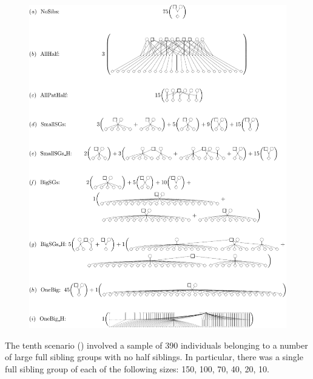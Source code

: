 \documentclass[11pt]{article}
\begin{document}
\begin{figure}
\begin{center}
\includegraphics[width=.90\textwidth]{images/ped_configs_figure.pdf}
\end{center}
\caption[Configuration of relationships in simulated samples of 75 individuals.  Individuals in samples 
are represented by diamonds.  They are connected to their mothers and fathers (circles and boxes, 
respectively) by a marriage-node representation of the pedigree \citep{Lau&She2003}. Founders in the 
pedigree are all unrelated.]{}
\label{fig:confs}
\end{figure}
The tenth scenario (\lottalarge) involved a sample of 390 individuals belonging to a number of large 
full sibling groups with no half siblings.  In particular, there was a single full sibling group of 
each of the following sizes: 150, 100, 70, 40, 20, 10.
\end{document}
